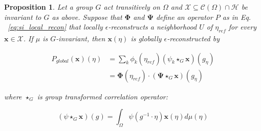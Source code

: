 \documentclass[10pt,a4paper]{amsart}
\newcommand{\cobrasPsi}[0]{\mathbf \Psi}
\newcommand{\cobrasPhi}[0]{\mathbf \Phi}
\newtheorem{proposition}{Proposition}
\begin{document}
\begin{proposition} \label{si_prop:lie_conv}
Let a group $G$ act transitively on $\Omega$ and $\mathcal X \subseteq \mathcal{C}(\Omega) \cap \mathcal H$ be invariant to $G$ as above. Suppose that  $\cobrasPhi$ and $\cobrasPsi$ define an operator $P$ as in Eq. ~\ref{eq:si_local_recon} that locally $\epsilon$-reconstructs a neighborhood $U$ of $\eta_{\textit{ref}}$ for every $\mathbf x \in \mathcal X$. If $\mu$ is $G$-invariant, then $\mathbf{x}(\eta)$ is globally $\epsilon$-reconstructed by

\begin{align}
    P_{\textit{global}}(\mathbf{x})(\eta) 
        &= \sum_k \phi_k(\eta_{\textit{ref}})\left(\psi_k \star_G \mathbf x\right)(g_\eta) \\
        &= 
        \cobrasPhi(\eta_{\textit{ref}}) 
        \cdot 
        \left(\cobrasPsi \star_G \mathbf{x} \right)(g_\eta)
\end{align}

\noindent where $\star_G$ is group transformed correlation operator:

$$\left(\psi \star_G \mathbf x\right)(g)
= \int_\Omega \psi(g^{-1} \cdot \eta) \mathbf{x}(\eta)d\mu(\eta)
$$


\end{proposition}
\end{document}
